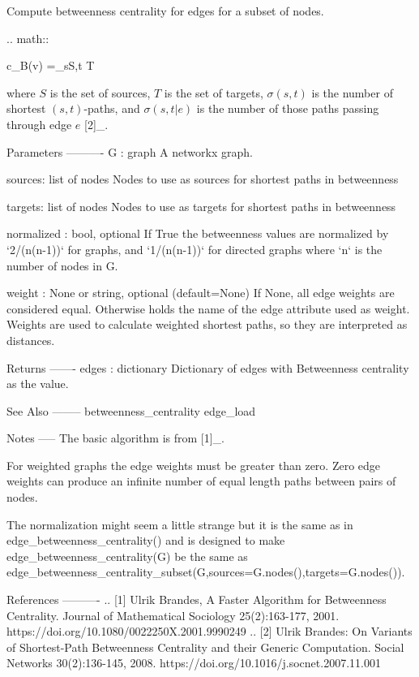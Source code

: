 \begin{DoxyVerb}Compute betweenness centrality for edges for a subset of nodes.

.. math::

   c_B(v) =\sum_{s\in S,t \in T} 

where $S$ is the set of sources, $T$ is the set of targets,
$\sigma(s, t)$ is the number of shortest $(s, t)$-paths,
and $\sigma(s, t|e)$ is the number of those paths
passing through edge $e$ [2]_.

Parameters
----------
G : graph
  A networkx graph.

sources: list of nodes
  Nodes to use as sources for shortest paths in betweenness

targets: list of nodes
  Nodes to use as targets for shortest paths in betweenness

normalized : bool, optional
  If True the betweenness values are normalized by `2/(n(n-1))`
  for graphs, and `1/(n(n-1))` for directed graphs where `n`
  is the number of nodes in G.

weight : None or string, optional (default=None)
  If None, all edge weights are considered equal.
  Otherwise holds the name of the edge attribute used as weight.
  Weights are used to calculate weighted shortest paths, so they are
  interpreted as distances.

Returns
-------
edges : dictionary
   Dictionary of edges with Betweenness centrality as the value.

See Also
--------
betweenness_centrality
edge_load

Notes
-----
The basic algorithm is from [1]_.

For weighted graphs the edge weights must be greater than zero.
Zero edge weights can produce an infinite number of equal length
paths between pairs of nodes.

The normalization might seem a little strange but it is the same
as in edge_betweenness_centrality() and is designed to make
edge_betweenness_centrality(G) be the same as
edge_betweenness_centrality_subset(G,sources=G.nodes(),targets=G.nodes()).

References
----------
.. [1] Ulrik Brandes, A Faster Algorithm for Betweenness Centrality.
   Journal of Mathematical Sociology 25(2):163-177, 2001.
   https://doi.org/10.1080/0022250X.2001.9990249
.. [2] Ulrik Brandes: On Variants of Shortest-Path Betweenness
   Centrality and their Generic Computation.
   Social Networks 30(2):136-145, 2008.
   https://doi.org/10.1016/j.socnet.2007.11.001
\end{DoxyVerb}
 